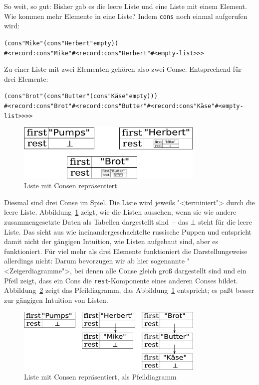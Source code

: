 So weit, so gut: Bisher gab es die leere Liste und eine Liste mit einem
Element.  Wie kommen mehr Elemente in eine Liste?  Indem
\texttt{cons} noch einmal aufgerufen wird:
%
\begin{alltt}
(cons "Mike" (cons "Herbert" empty))
\evalsto{}#<record:cons "Mike" #<record:cons "Herbert" #<empty-list>>>
\end{alltt}
%
Zu einer Liste mit zwei Elementen gehören also zwei Conse.
Entsprechend für drei Elemente:
%
\begin{alltt}
(cons "Brot" (cons "Butter" (cons "Käse" empty)))
\evalsto{}#<record:cons "Brot" #<record:cons "Butter" #<record:cons "Käse" #<empty-list>>>>
\end{alltt}
%
\begin{figure}[tb]
  \centering
  \includegraphics[width=0.8\textwidth]{pair-lists1}
  \caption{Liste mit Consen repräsentiert}
  \label{fig:cons-lists-1}
\end{figure}
Diesmal sind drei Conse im Spiel.  Die Liste wird jeweils
"<terminiert"> durch die leere Liste.  Abbildung~\ref{fig:cons-lists-1}
zeigt, wie die Listen aussehen, wenn sie wie andere zusammengesetzte
Daten als Tabellen dargestellt sind~-- das $\bot$ steht für die leere
Liste. Das sieht aus wie ineinandergeschachtelte russische Puppen und
entspricht damit nicht der gängigen Intuition, wie Listen aufgebaut
sind, aber es funktioniert.  Für viel mehr als drei Elemente
funktioniert die Darstellungsweise allerdings nicht: Darum bevorzugen
wir ab hier sogenannte "<Zeigerdiagramme">, bei denen alle Conse gleich groß
dargestellt sind und ein Pfeil zeigt, dass ein Cons die
\texttt{rest}-Komponente eines anderen Conses bildet.
Abbildung~\ref{fig:cons-lists-2} zeigt das Pfeildiagramm, das
Abbildung~\ref{fig:cons-lists-1} entspricht; es paßt besser zur
gängigen Intuition von Listen.

\begin{figure}[tb]
  \centering
  \includegraphics[width=0.8\textwidth]{pair-lists2}
  \caption{Liste mit Consen repräsentiert, als Pfeildiagramm}
  \label{fig:cons-lists-2}
\end{figure}


